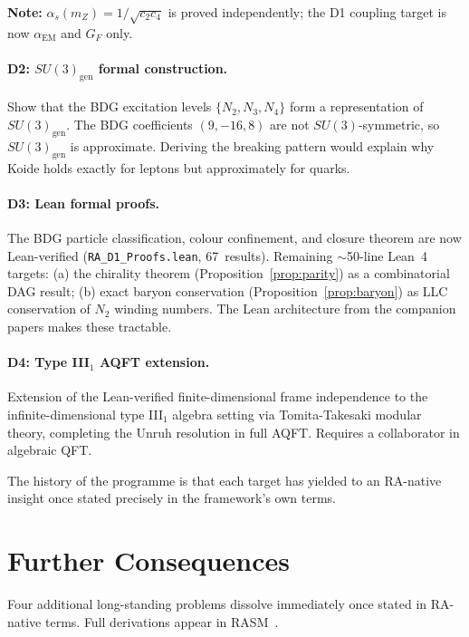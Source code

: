 \documentclass[11pt,a4paper]{article}
\begin{document}
\textbf{Note:} $\alpha_s(m_Z) = 1/\!\sqrt{c_2 c_4}$ is proved independently;
the D1 coupling target is now $\alpha_{\mathrm{EM}}$ and $G_F$ only.

\paragraph{D2: $SU(3)_{\mathrm{gen}}$ formal construction.}
Show that the BDG excitation levels $\{N_2, N_3, N_4\}$ form a
representation of $SU(3)_{\mathrm{gen}}$. The BDG coefficients
$(9,-16,8)$ are not $SU(3)$-symmetric, so $SU(3)_{\mathrm{gen}}$
is approximate. Deriving the breaking pattern would explain why
Koide holds exactly for leptons but approximately for quarks.

\paragraph{D3: Lean formal proofs.}
The BDG particle classification, colour confinement, and closure theorem are now Lean-verified (\texttt{RA\_D1\_Proofs.lean}, 67~results). Remaining $\sim$50-line Lean~4 targets: (a) the chirality theorem
(Proposition~\ref{prop:parity}) as a combinatorial DAG result; (b)
exact baryon conservation (Proposition~\ref{prop:baryon}) as LLC
conservation of $N_2$ winding numbers. The Lean architecture
from the companion papers makes these tractable.

\paragraph{D4: Type III$_1$ AQFT extension.}
Extension of the Lean-verified finite-dimensional frame independence
to the infinite-dimensional type III$_1$ algebra setting via
Tomita-Takesaki modular theory, completing the Unruh resolution
in full AQFT. Requires a collaborator in algebraic QFT.

The history of the programme is that each target has yielded to an
RA-native insight once stated precisely in the framework's own terms.

\section{Further Consequences}
\label{sec:further_consequences}

Four additional long-standing problems dissolve immediately once stated
in RA-native terms. Full derivations appear in RASM~\citep{Sandeman2026RASM}.
\end{document}
